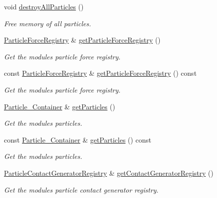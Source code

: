 \begin{DoxyCompactItemize}
void \mbox{\hyperlink{classr3_1_1_particle_world_aa061b4eab09216fb7e3a8d08cbdb6dd2}{destroy\+All\+Particles}} ()
\begin{DoxyCompactList}\small\item\em Free memory of all particles. \end{DoxyCompactList}\item 
\mbox{\hyperlink{classr3_1_1_particle_force_registry}{Particle\+Force\+Registry}} \& \mbox{\hyperlink{classr3_1_1_particle_world_aaa3f952fdfd8862673d41afa078245bf}{get\+Particle\+Force\+Registry}} ()
\begin{DoxyCompactList}\small\item\em Get the module\textquotesingle{}s particle force registry. \end{DoxyCompactList}\item 
const \mbox{\hyperlink{classr3_1_1_particle_force_registry}{Particle\+Force\+Registry}} \& \mbox{\hyperlink{classr3_1_1_particle_world_add0e006264e25065ff226eafc0c1a29d}{get\+Particle\+Force\+Registry}} () const
\begin{DoxyCompactList}\small\item\em Get the module\textquotesingle{}s particle force registry. \end{DoxyCompactList}\item 
\mbox{\hyperlink{classr3_1_1_particle_world_aa354f6786c0837674fe8286f00465631}{Particle\+\_\+\+Container}} \& \mbox{\hyperlink{classr3_1_1_particle_world_a00a5014002f28e35ebb59a3f8175db3c}{get\+Particles}} ()
\begin{DoxyCompactList}\small\item\em Get the module\textquotesingle{}s particles. \end{DoxyCompactList}\item 
const \mbox{\hyperlink{classr3_1_1_particle_world_aa354f6786c0837674fe8286f00465631}{Particle\+\_\+\+Container}} \& \mbox{\hyperlink{classr3_1_1_particle_world_ab816d6bca8b42fdf16170275087008f0}{get\+Particles}} () const
\begin{DoxyCompactList}\small\item\em Get the module\textquotesingle{}s particles. \end{DoxyCompactList}\item 
\mbox{\hyperlink{classr3_1_1_particle_contact_generator_registry}{Particle\+Contact\+Generator\+Registry}} \& \mbox{\hyperlink{classr3_1_1_particle_world_a85fc9fcf5c51a5bbce206a35a82f8ccf}{get\+Contact\+Generator\+Registry}} ()
\begin{DoxyCompactList}\small\item\em Get the module\textquotesingle{}s particle contact generator registry. \end{DoxyCompactList}\item 

\end{DoxyCompactItemize}
